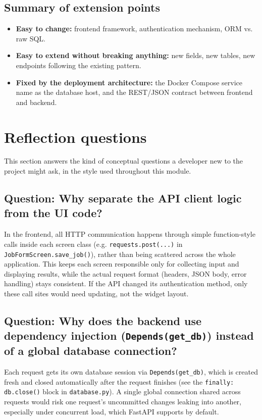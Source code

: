 \documentclass[11pt,a4paper]{article}
\begin{document}
\subsection{Summary of extension points}

\begin{itemize}
  \item \textbf{Easy to change:} frontend framework, authentication mechanism, ORM vs. raw SQL.
  \item \textbf{Easy to extend without breaking anything:} new fields, new tables, new endpoints following the existing pattern.
  \item \textbf{Fixed by the deployment architecture:} the Docker Compose service name as the database host, and the REST/JSON contract between frontend and backend.
\end{itemize}

\section{Reflection questions}

This section answers the kind of conceptual questions a developer new to the project might ask, in the style used throughout this module.

\subsection*{Question: Why separate the API client logic from the UI code?}

In the frontend, all HTTP communication happens through simple function-style calls inside each screen class (e.g. \texttt{requests.post(...)} in \texttt{JobFormScreen.save\_job()}), rather than being scattered across the whole application. This keeps each screen responsible only for collecting input and displaying results, while the actual request format (headers, JSON body, error handling) stays consistent. If the API changed its authentication method, only these call sites would need updating, not the widget layout.

\subsection*{Question: Why does the backend use dependency injection (\texttt{Depends(get\_db)}) instead of a global database connection?}

Each request gets its own database session via \texttt{Depends(get\_db)}, which is created fresh and closed automatically after the request finishes (see the \texttt{finally: db.close()} block in \texttt{database.py}). A single global connection shared across requests would risk one request's uncommitted changes leaking into another, especially under concurrent load, which FastAPI supports by default.
\end{document}
